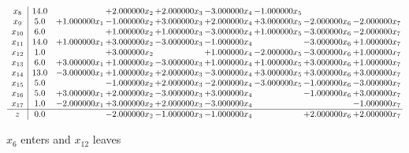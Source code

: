 \documentclass[10pt]{article}
\begin{document}
\[\begin{array}{c| c c@{\hskip 2pt} c@{\hskip 2pt} c@{\hskip 2pt} c@{\hskip 2pt} c@{\hskip 2pt} c@{\hskip 2pt} c@{\hskip 2pt} }
 x_{8}   &  14.0  &   & + 2.000000 x_{2} & + 2.000000 x_{3} & -3.000000 x_{4} & -1.000000 x_{5} &    &   \\
 x_{9}   &  5.0 & + 1.000000 x_{1} & -1.000000 x_{2} & + 3.000000 x_{3} & + 2.000000 x_{4} & + 3.000000 x_{5} & -2.000000 x_{6} & -2.000000 x_{7}\\
 x_{10}   &  6.0  &   & + 1.000000 x_{2} & + 1.000000 x_{3} & -3.000000 x_{4} & + 1.000000 x_{5} & -3.000000 x_{6} & -2.000000 x_{7}\\
 x_{11}   &  14.0 & + 1.000000 x_{1} & + 3.000000 x_{2} & -3.000000 x_{3} & -1.000000 x_{4} &   & -3.000000 x_{6} & + 1.000000 x_{7}\\
 x_{12}   &  1.0  &   & + 3.000000 x_{2} &   & + 1.000000 x_{4} & -2.000000 x_{5} & -3.000000 x_{6} & + 1.000000 x_{7}\\
 x_{13}   &  6.0 & + 3.000000 x_{1} & + 1.000000 x_{2} & -3.000000 x_{3} & + 1.000000 x_{4} & + 1.000000 x_{5} & + 3.000000 x_{6} & + 1.000000 x_{7}\\
 x_{14}   &  13.0 & -3.000000 x_{1} & + 1.000000 x_{2} & + 2.000000 x_{3} & -3.000000 x_{4} & + 3.000000 x_{5} & + 3.000000 x_{6} & + 3.000000 x_{7}\\
 x_{15}   &  5.0  &   & -1.000000 x_{2} & + 2.000000 x_{3} & -2.000000 x_{4} & -3.000000 x_{5} & -1.000000 x_{6} & -3.000000 x_{7}\\
 x_{16}   &  5.0 & + 3.000000 x_{1} & + 2.000000 x_{2} & -3.000000 x_{3} & + 3.000000 x_{4} &   & -1.000000 x_{6} & + 3.000000 x_{7}\\
 x_{17}   &  1.0 & -2.000000 x_{1} & + 3.000000 x_{2} & + 2.000000 x_{3} & -3.000000 x_{4} &    &   & -1.000000 x_{7}\\
\hline
z    &  0.0  &   & -2.000000 x_{2} & -1.000000 x_{3} & -1.000000 x_{4} &   & + 2.000000 x_{6} & + 2.000000 x_{7}\\
\end{array}\]


 $ x_{6} $ enters and $ x_{12} $ leaves 
\end{document}
